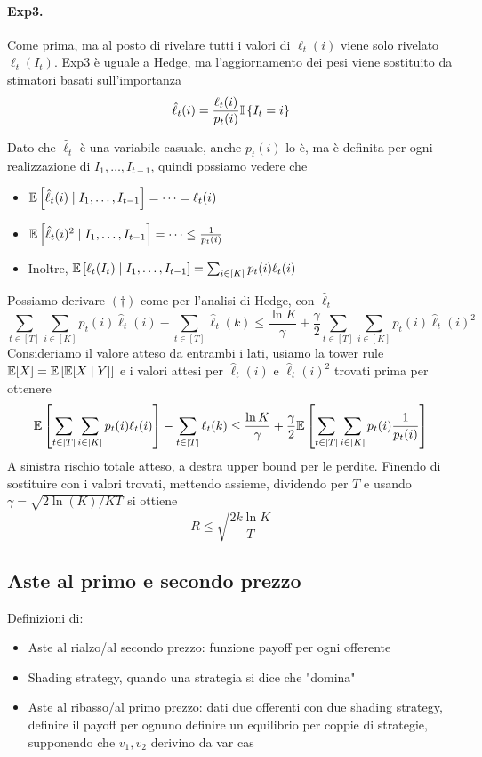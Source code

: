 \paragraph{Exp3.} Come prima, ma al posto di rivelare tutti i valori di $\ell_t(i)$ viene solo rivelato $\ell_t(I_t)$. Exp3 è uguale a Hedge, ma l'aggiornamento dei pesi viene sostituito da stimatori basati sull'importanza
$$ \hat \ell_t (i) = \frac{\ell_t (i)}{p_t(i)} \mathbb{I} \left\{I_t = i\right\} $$

Dato che $\hat \ell_t$ è una variabile casuale, anche $p_t (i)$ lo è, ma è definita per ogni realizzazione di $I_1, \dots, I_{t-1}$, quindi possiamo vedere che
\begin{itemize}
    \item $\mathbb{E} \left[\hat \ell_t (i) \mid I_1, \dots, I_{t-1}\right] = \dots = \ell_t (i)$

    \item $\mathbb{E} \left[\hat \ell_t (i)^2 \mid I_1, \dots, I_{t-1}\right] = \dots \leq \frac{1}{p_t(i)}$

    \item Inoltre, $\mathbb{E} \left[\ell_t (I_t) \mid I_1, \dots, I_{t-1}\right] = \sum_{i \in [K]} p_t (i) \ell_t (i)$
\end{itemize}

Possiamo derivare $(\dag)$ come per l'analisi di Hedge, con $\hat \ell_t$
\[\sum_{t \in [T]} \sum_{i \in [K]} p_t (i) \hat \ell_t (i) - \sum_{t \in [T]} \hat \ell_t (k) \leq \frac{\ln K}{\gamma} + \frac{\gamma}{2} \sum_{t \in [T]} \sum_{i \in [K]} p_t(i) \hat \ell_t (i)^2 \tag{\dag}\]
Consideriamo il valore atteso da entrambi i lati, usiamo la tower rule $\mathbb{E} [X] = \mathbb{E} \left[\mathbb{E} [X \mid Y]\right]$ e i valori attesi per $\hat \ell_t (i)$ e $\hat \ell_t (i)^2$ trovati prima per ottenere
$$ \mathbb{E} \left[ \sum_{t \in [T]} \sum_{i \in [K]} p_t (i) \ell_t (i)\right] - \sum_{t \in [T]} \ell_t (k) \leq \frac{\ln K}{\gamma} + \frac{\gamma}{2} \mathbb{E} \left[ \sum_{t \in [T]} \sum_{i \in [K]} p_t (i) \frac{1}{p_t(i)} \right] $$
A sinistra rischio totale atteso, a destra upper bound per le perdite. Finendo di sostituire con i valori trovati, mettendo assieme, dividendo per $T$ e usando $\gamma = \sqrt{2 \ln (K)/ KT}$ si ottiene
$$ R \leq \sqrt{\frac{2 k \ln K}{T}} $$

\subsection{Aste al primo e secondo prezzo}

Definizioni di:
\begin{itemize}
    \item Aste al rialzo/al secondo prezzo: funzione payoff per ogni offerente

    \item Shading strategy, quando una strategia si dice che "domina"

    \item Aste al ribasso/al primo prezzo: dati due offerenti con due shading strategy, definire il payoff per ognuno definire un equilibrio per coppie di strategie, supponendo che $v_1, v_2$ derivino da var cas
\end{itemize}

